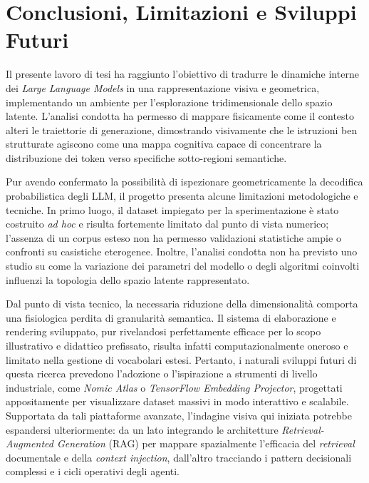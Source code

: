 \section{Conclusioni, Limitazioni e Sviluppi Futuri}
\label{sec:conclusioni}

Il presente lavoro di tesi ha raggiunto l'obiettivo di tradurre le dinamiche interne dei \textit{Large Language Models} in una rappresentazione visiva e geometrica, implementando un ambiente per l'esplorazione tridimensionale dello spazio latente. L'analisi condotta ha permesso di mappare fisicamente come il contesto alteri le traiettorie di generazione, dimostrando visivamente che le istruzioni ben strutturate agiscono come una mappa cognitiva capace di concentrare la distribuzione dei token verso specifiche sotto-regioni semantiche. 

Pur avendo confermato la possibilità di ispezionare geometricamente la decodifica probabilistica degli LLM, il progetto presenta alcune limitazioni metodologiche e tecniche. In primo luogo, il dataset impiegato per la sperimentazione è stato costruito \textit{ad hoc} e risulta fortemente limitato dal punto di vista numerico; l'assenza di un corpus esteso non ha permesso validazioni statistiche ampie o confronti su casistiche eterogenee. Inoltre, l'analisi condotta non ha previsto uno studio su come la variazione dei parametri del modello o degli algoritmi coinvolti influenzi la topologia dello spazio latente rappresentato. 

Dal punto di vista tecnico, la necessaria riduzione della dimensionalità comporta una fisiologica perdita di granularità semantica. Il sistema di elaborazione e rendering sviluppato, pur rivelandosi perfettamente efficace per lo scopo illustrativo e didattico prefissato, risulta infatti computazionalmente oneroso e limitato nella gestione di vocabolari estesi. Pertanto, i naturali sviluppi futuri di questa ricerca prevedono l'adozione o l'ispirazione a strumenti di livello industriale, come \textit{Nomic Atlas} o \textit{TensorFlow Embedding Projector}, progettati appositamente per visualizzare dataset massivi in modo interattivo e scalabile. Supportata da tali piattaforme avanzate, l'indagine visiva qui iniziata potrebbe espandersi ulteriormente: da un lato integrando le architetture \textit{Retrieval-Augmented Generation} (RAG) per mappare spazialmente l'efficacia del \textit{retrieval} documentale e della \textit{context injection}, dall'altro tracciando i pattern decisionali complessi e i cicli operativi degli agenti.